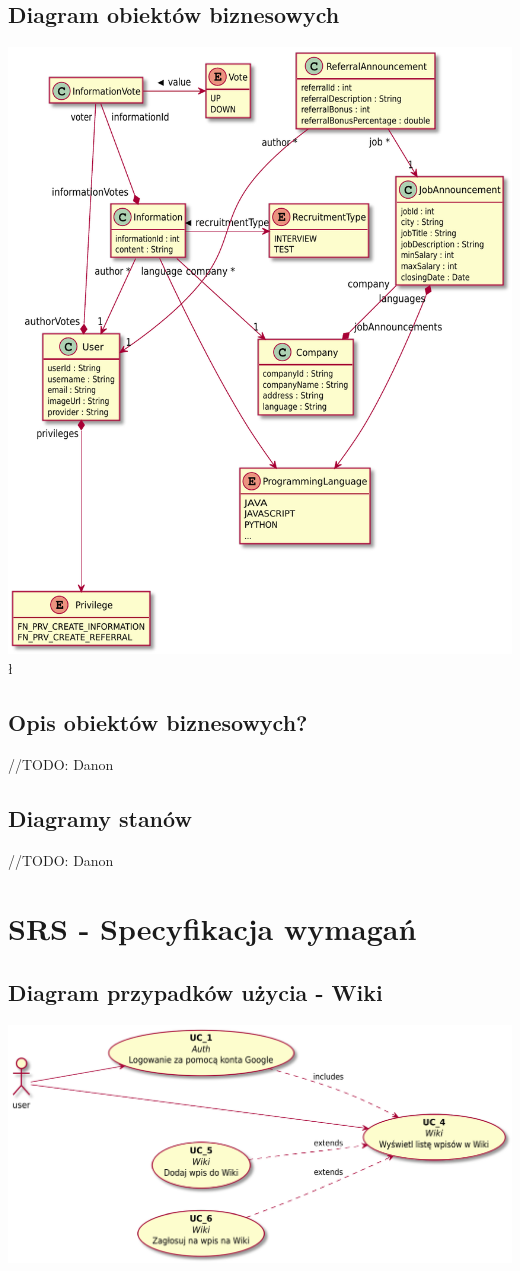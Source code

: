 \documentclass[oneside]{scrreprt}
\begin{document}
\section{Diagram obiektów biznesowych}
\includegraphics[width=\textwidth, keepaspectratio]{graphics/hydra_business_class_diagram.pdf}
ł
\section{Opis obiektów biznesowych?}
//TODO: Danon

\section{Diagramy stanów}
//TODO: Danon

\chapter{SRS - Specyfikacja wymagań}
\section{Diagram przypadków użycia - Wiki}
\includegraphics[width=\textwidth, keepaspectratio]{graphics/wiki_use_case_diagram.pdf}
\end{document}
